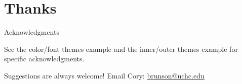 \documentclass{beamer}
\begin{document}
\section{Thanks}


\begin{frame}{Acknowledgments}
\label{slide:acknowledgments}

See the color/font themes example and the inner/outer themes example for specific acknowledgments.

Suggestions are always welcome! Email Cory: \href{mailto:brunson@uchc.edu}{\ttfamily brunson@uchc.edu}

\end{frame}
\end{document}
